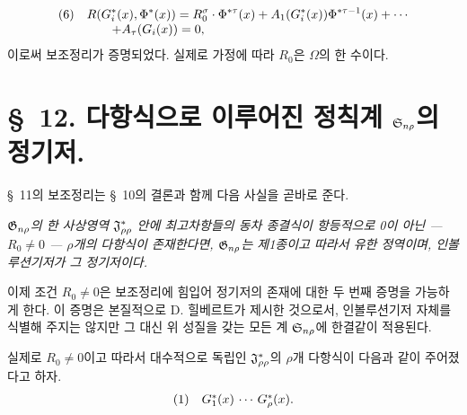 \[
\begin{array}{@{}l@{\quad}l@{}}
(6)& \displaystyle R(G_i^*(x),\Phi^*(x))=R_0^\sigma\cdot\Phi^{*\tau}(x)+A_1(G_i^*(x))\Phi^{*\tau-1}(x)+\cdots\\
& \displaystyle\qquad +A_\tau(G_i(x))=0,
\end{array}
\]
이로써 보조정리가 증명되었다. 실제로 가정에 따라 $R_0$은 $\Omega$의 한 수이다.

\section*{\S\ 12. 다항식으로 이루어진 정칙계 $\mathfrak S_{n\rho}$의 정기저.}

\S\ 11의 보조정리는 \S\ 10의 결론과 함께 다음 사실을 곧바로 준다.

\emph{$\mathfrak G_{n\rho}$의 한 사상영역 $\mathfrak J^*_{\rho\rho}$ 안에 최고차항들의 동차 종결식이 항등적으로 0이 아닌 --- $R_0\ne0$ --- $\rho$개의 다항식이 존재한다면, $\mathfrak G_{n\rho}$는 제1종이고 따라서 유한 정역이며, 인볼루션기저가 그 정기저이다.}

이제 조건 $R_0\ne0$은 보조정리에 힘입어 정기저의 존재에 대한 두 번째 증명을 가능하게 한다. 이 증명은 본질적으로 D. 힐베르트가 제시한 것으로서, 인볼루션기저 자체를 식별해 주지는 않지만 그 대신 위 성질을 갖는 모든 계 $\mathfrak S_{n\rho}$에 한결같이 적용된다.

실제로 $R_0\ne0$이고 따라서 대수적으로 독립인 $\mathfrak J^*_{\rho\rho}$의 $\rho$개 다항식이 다음과 같이 주어졌다고 하자.
\[
\begin{array}{@{}l@{\quad}c@{}}
(1)& G_1^*(x)\rcdots G_\rho^*(x).
\end{array}
\]

